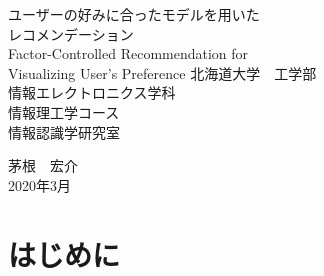 \documentclass[a4j,11pt]{jarticle}           %
\begin{document}
	\begin{titlepage}
		\setcounter{page}{0}
		\begin{center}
			\vspace*{2.0cm}
			\LARGE
			ユーザーの好みに合ったモデルを用いた\\レコメンデーション\\
			\vfill
			Factor-Controlled Recommendation for \\Visualizing User's Preference
			\vfill
			\LARGE
			北海道大学　工学部\\
			情報エレクトロニクス学科\\
			情報理工学コース\\
			情報認識学研究室
			
			\vspace{2ex}
			茅根　宏介\\
			\vspace{2ex}
			2020年3月\\
			\vspace*{2cm}
		\end{center}
	\end{titlepage}
	\tableofcontents \thispagestyle{empty}
	\newpage
	\listoffigures
	
	\listoftables
	\clearpage 
	\pagestyle{plain} 
	
	
	\section{はじめに}
\end{document}
